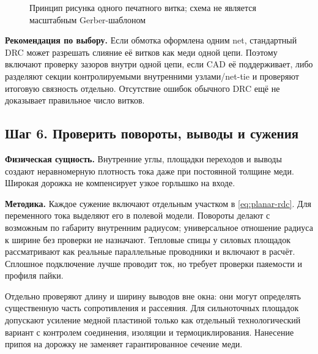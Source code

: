 \documentclass[14pt,a4paper]{extarticle}
\newcommand{\phys}{\par\noindent\textbf{Физическая сущность.} }
\newcommand{\method}{\par\noindent\textbf{Методика.} }
\newcommand{\recommend}{\par\noindent\textbf{Рекомендация по выбору.} }
\begin{document}
\begin{figure}[H]\centering
{}
\caption{Принцип рисунка одного печатного витка; схема не является масштабным Gerber-шаблоном}
\label{pl:fig:turn}
\end{figure}

\recommend Если обмотка оформлена одним net, стандартный DRC может разрешать слияние её витков как меди одной цепи. Поэтому включают проверку зазоров внутри одной цепи, если CAD её поддерживает, либо разделяют секции контролируемыми внутренними узлами/net-tie и проверяют итоговую связность отдельно. Отсутствие ошибок обычного DRC ещё не доказывает правильное число витков.

\subsection{Шаг 6. Проверить повороты, выводы и сужения}
\phys Внутренние углы, площадки переходов и выводы создают неравномерную плотность тока даже при постоянной толщине меди. Широкая дорожка не компенсирует узкое горлышко на входе.

\method Каждое сужение включают отдельным участком в \eqref{eq:planar-rdc}. Для переменного тока выделяют его в полевой модели. Повороты делают с возможным по габариту внутренним радиусом; универсальное отношение радиуса к ширине без проверки не назначают. Тепловые спицы у силовых площадок рассматривают как реальные параллельные проводники и включают в расчёт. Сплошное подключение лучше проводит ток, но требует проверки паяемости и профиля пайки.

Отдельно проверяют длину и ширину выводов вне окна: они могут определять существенную часть сопротивления и рассеяния. Для сильноточных площадок допускают усиление медной пластиной только как отдельный технологический вариант с контролем соединения, изоляции и термоциклирования. Нанесение припоя на дорожку не заменяет гарантированное сечение меди.
\end{document}
